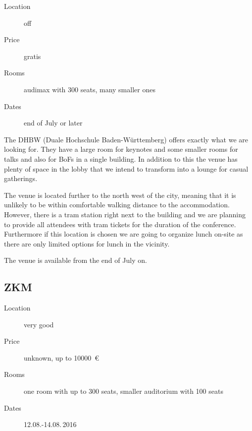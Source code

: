 

\begin{description}
\item[Location] off
\item[Price] gratis
\item[Rooms] audimax with 300 seats, many smaller ones
\item[Dates] end of July or later
\end{description}

The DHBW (Duale Hochschule Baden-Württemberg) offers exactly what we are looking for.
They have a large room for keynotes and some smaller rooms for talks and
also for BoFs in a single building. In addition to this the venue has
plenty of space in the lobby that we intend to transform into a lounge for
casual gatherings.

The venue is located further to the north west of the city, meaning that it is
unlikely to be within comfortable walking distance to the accommodation. However,
there is a tram station right next to the building and we are planning
to provide all attendees with tram tickets for the duration of the
conference. Furthermore if this location is chosen we are going to organize
lunch on-site as there are only limited options for lunch in the vicinity.

The venue is available from the end of July on.


\subsection{ZKM}
\begin{description}
\item[Location] very good
\item[Price] unknown, up to \SI{10000}{\euro}
\item[Rooms] one room with up to 300 seats, smaller auditorium with 100 seats
\item[Dates] 12.08.-14.08.\,2016
\end{description}

